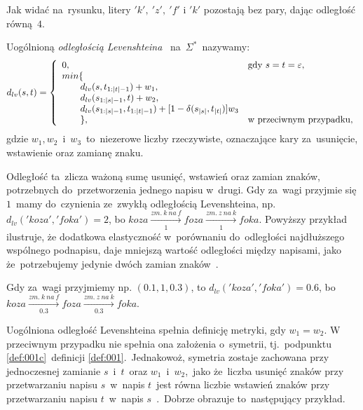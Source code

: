 \documentclass{praca1}
\begin{document}
Jak widać na~rysunku, litery $'k',\ 'z',\ 'f'$ i $'k'$ pozostają bez pary, dając odległość równą~$4$.

\begin{definition}
Uogólnioną \emph{odległością Levenshteina} \cite{Levenshtein1965:binarycodes}~na~$\Sigma^*$~nazywamy:
$$
d_{lv}(s, t) = \left\{
\begin{array}{l l}     
    0, & \text{gdy } s = t = \varepsilon,\\
    min\{ & \\
\qquad    d_{lv}(s, t_{1:|t|-1}) + w_1, & \\
\qquad    d_{lv}(s_{1:|s|-1}, t) + w_2, & \\
\qquad    d_{lv}(s_{1:|s|-1}, t_{1:|t|-1}) + [1-\delta(s_{|s|}, t_{|t|})]w_3 & \\
\qquad    \}, & \text{w przeciwnym przypadku},
\end{array}\right.
$$
gdzie $w_1, w_2$~i~$w_3$~to~niezerowe liczby rzeczywiste, oznaczające kary za~usunięcie, wstawienie oraz zamianę znaku.
\end{definition}

Odległość ta~zlicza ważoną sumę usunięć, wstawień oraz zamian znaków, potrzebnych do~przetworzenia jednego napisu w~drugi. Gdy za~wagi przyjmie się $1$~mamy do~czynienia ze~zwykłą odległością Levenshteina, np.~$d_{lv}('koza', 'foka') = 2$, bo $koza  \xrightarrow[1]{zm.\ k\ na\ f} foza  \xrightarrow[1]{zm.\ z\ na\ k} foka$. Powyższy przykład ilustruje, że dodatkowa elastyczność w~porównaniu do~odległości najdłuższego wspólnego podnapisu, daje mniejszą wartość odległości między napisami, jako że~potrzebujemy jedynie dwóch zamian znaków~\cite{Loo2014:stringdist}.

Gdy za~wagi przyjmiemy np. $(0.1, 1, 0.3)$, to $d_{lv}('koza', 'foka') = 0.6$, bo~$koza  \xrightarrow[0.3]{zm.\ k\ na\ f} foza  \xrightarrow[0.3]{zm.\ z\ na\ k} foka$.

Uogólniona odległość Levenshteina spełnia definicję metryki, gdy $w_1 = w_2$. W przeciwnym przypadku nie spełnia ona założenia o~symetrii, tj.~podpunktu \ref{def:001c}~definicji \ref{def:001}.~Jednakowoż, symetria zostaje zachowana przy jednoczesnej zamianie $s$~i~$t$~oraz $w_1$~i~$w_2$,~jako że~liczba usunięć znaków przy przetwarzaniu napisu $s$~w~napis $t$~jest równa liczbie wstawień znaków przy przetwarzaniu napisu $t$~w~napis $s$~\cite{Loo2014:stringdist}.~Dobrze obrazuje to~następujący przykład.
\end{document}
